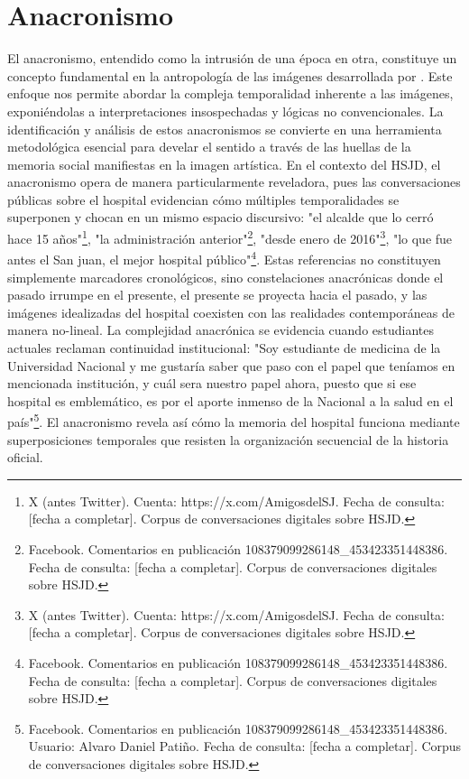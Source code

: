 \section{Anacronismo}

El anacronismo, entendido como la intrusión de una época en otra, constituye un concepto fundamental en la antropología de las imágenes desarrollada por \parencite{DidiHuberman2011}. Este enfoque nos permite abordar la compleja temporalidad inherente a las imágenes, exponiéndolas a interpretaciones insospechadas y lógicas no convencionales. La identificación y análisis de estos anacronismos se convierte en una herramienta metodológica esencial para develar el sentido a través de las huellas de la memoria social manifiestas en la imagen artística. En el contexto del HSJD, el anacronismo opera de manera particularmente reveladora, pues las conversaciones públicas sobre el hospital evidencian cómo múltiples temporalidades se superponen y chocan en un mismo espacio discursivo: "el alcalde que lo cerró hace 15 años"\footnote{X (antes Twitter). Cuenta: https://x.com/AmigosdelSJ. Fecha de consulta: [fecha a completar]. Corpus de conversaciones digitales sobre HSJD.}, "la administración anterior"\footnote{Facebook. Comentarios en publicación 108379099286148\_453423351448386. Fecha de consulta: [fecha a completar]. Corpus de conversaciones digitales sobre HSJD.}, "desde enero de 2016"\footnote{X (antes Twitter). Cuenta: https://x.com/AmigosdelSJ. Fecha de consulta: [fecha a completar]. Corpus de conversaciones digitales sobre HSJD.}, "lo que fue antes el San juan, el mejor hospital público"\footnote{Facebook. Comentarios en publicación 108379099286148\_453423351448386. Fecha de consulta: [fecha a completar]. Corpus de conversaciones digitales sobre HSJD.}. Estas referencias no constituyen simplemente marcadores cronológicos, sino constelaciones anacrónicas donde el pasado irrumpe en el presente, el presente se proyecta hacia el pasado, y las imágenes idealizadas del hospital coexisten con las realidades contemporáneas de manera no-lineal. La complejidad anacrónica se evidencia cuando estudiantes actuales reclaman continuidad institucional: "Soy estudiante de medicina de la Universidad Nacional y me gustaría saber que paso con el papel que teníamos en mencionada institución, y cuál sera nuestro papel ahora, puesto que si ese hospital es emblemático, es por el aporte inmenso de la Nacional a la salud en el país"\footnote{Facebook. Comentarios en publicación 108379099286148\_453423351448386. Usuario: Alvaro Daniel Patiño. Fecha de consulta: [fecha a completar]. Corpus de conversaciones digitales sobre HSJD.}. El anacronismo revela así cómo la memoria del hospital funciona mediante superposiciones temporales que resisten la organización secuencial de la historia oficial.


